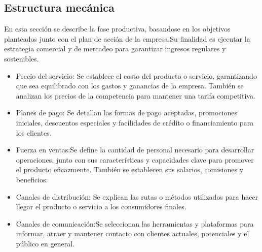 \subsection{Estructura mecánica}

En esta sección se describe la fase productiva, basandose en los objetivos planteados junto con el plan de acción de la empresa.Su finalidad es ejecutar la estrategia comercial y de mercadeo para garantizar ingresos regulares y sostenibles.

\begin{itemize}
    \item Precio del servicio: Se establece el costo del producto o servicio, garantizando que sea equilibrado con los gastos y ganancias de la empresa. También se analizan los precios de la competencia para mantener una tarifa competitiva.
    
    \item Planes de pago: Se detallan las formas de pago aceptadas, promociones iniciales, descuentos especiales y facilidades de crédito o financiamiento para los clientes.

    \item Fuerza en ventas:Se define la cantidad de personal necesario para desarrollar operaciones, junto con sus características y capacidades clave para promover el producto eficazmente. También se establecen sus salarios, comisiones y beneficios.

    \item Canales de distribución: Se explican las rutas o métodos utilizados para hacer llegar el producto o servicio a los consumidores finales.
    
    \item Canales de comunicación:Se seleccionan las herramientas y plataformas para informar, atraer y mantener contacto con clientes actuales, potenciales y el público en general.
\end{itemize}
